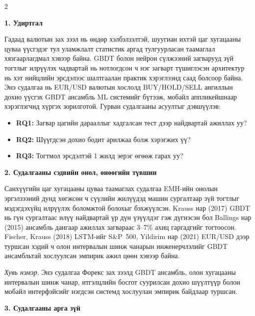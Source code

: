 \begin{multicols*}{2}
\setlength{\parskip}{4pt}
\setlength{\intextsep}{4pt}
\setlength{\textfloatsep}{4pt}
\setlength{\abovecaptionskip}{2pt}
\setlength{\belowcaptionskip}{2pt}
\sloppy

\noindent\textbf{1. Удиртгал}

Гадаад валютын зах зээл нь өндөр хэлбэлзэлтэй, шуугиан ихтэй цаг хугацааны цуваа үүсгэдэг тул уламжлалт статистик аргад тулгуурласан таамаглал хязгаарлагдмал хэвээр байна. GBDT болон нейрон сүлжээний загварууд зүй тогтлыг илрүүлэх чадвартай нь нотлогдсон ч нэг загварт түшиглэсэн архитектур нь хэт нийцлийн эрсдэлээс шалтгаалан практик хэрэглээнд саад болсоор байна. Энэ судалгаа нь EUR/USD валютын хослолд BUY/HOLD/SELL ангиллын дохио үүсгэх GBDT ансамбль ML системийг бүтээж, мобайл аппликейшнаар хэрэглэгчид хүргэх зорилготой. Гурван судалгааны асуултыг дэвшүүлэв:
\begin{itemize}\setlength\itemsep{0pt}\small
    \item \textbf{RQ1:} Загвар цагийн дарааллыг хадгалсан тест дээр найдвартай ажиллах уу?
    \item \textbf{RQ2:} Шүүгдсэн дохио бодит арилжаа болж хэрэгжих үү?
    \item \textbf{RQ3:} Тогтмол эрсдэлтэй 1 жилд эерэг өгөөж гарах уу?
\end{itemize}

\noindent\textbf{2. Судалгааны сэдвийн онол, өнөөгийн түвшин}

Санхүүгийн цаг хугацааны цуваа таамаглах судалгаа EMH-ийн онолын эргэлзээний дунд хөгжсөн ч сүүлийн жилүүдэд машин сургалтаар зүй тогтлыг мэдэгдэхүйц илрүүлэх боломжтой болохыг бэхжүүлсэн. Krauss нар (2017) GBDT нь гүн сургалтаас илүү найдвартай үр дүн үзүүлдэг гэж дүгнэсэн бол Ballings нар (2015) ансамбль дангаар ажиллах загвараас 3--7\% ахиц гаргадгийг тогтоосон. Fischer, Krauss (2018) LSTM-ийг S\&P~500, Yildirim нар (2021) EUR/USD дээр туршсан хэдий ч олон интервалын шинж чанарын инженерчлэлийг GBDT ансамбльтай хослуулсан эмпирик ажил цөөн хэвээр байна.

\emph{Хувь нэмэр.} Энэ судалгаа Форекс зах зээлд GBDT ансамбль, олон хугацааны интервалын шинж чанар, итгэлцлийн босгот суурилсан дохио шүүлтүүр болон мобайл интерфэйсийг нэгдсэн системд хослуулан эмпирик байдлаар туршсан.

\noindent\textbf{3. Судалгааны арга зүй}


\end{multicols*}
